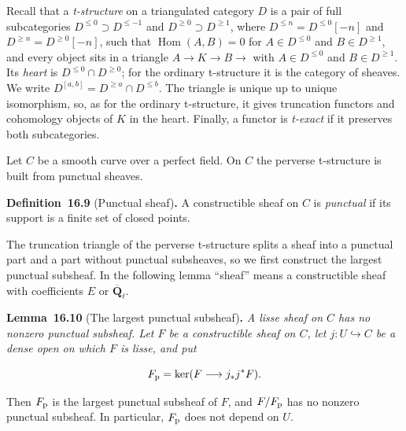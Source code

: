 \documentclass[11pt]{article}
\newenvironment{bpstatement}[2]{\par\addvspace{0.6\baselineskip}\noindent\textbf{#1}#2\textbf{.}\enspace\ignorespaces}
  {\par\addvspace{0.4\baselineskip}}
\newenvironment{bpstatementit}[2]{\begin{bpstatement}{#1}{#2}\itshape\ignorespaces}{\end{bpstatement}}
\providecommand{\Hom}{}\renewcommand{\Hom}{\operatorname{Hom}}
\begin{document}
Recall that a \emph{t-structure} on a triangulated category \(D\) is a pair of full subcategories \(D^{\le0}\supset D^{\le-1}\) and \(D^{\ge0}\supset D^{\ge1}\), where \(D^{\le n}=D^{\le0}[-n]\) and \(D^{\ge n}=D^{\ge0}[-n]\), such that \(\Hom(A,B)=0\) for \(A\in D^{\le0}\) and \(B\in D^{\ge1}\), and every object sits in a triangle \(A\to K\to
B\to\) with \(A\in D^{\le0}\) and \(B\in D^{\ge1}\). Its \emph{heart} is \(D^{\le0}\cap D^{\ge0}\); for the ordinary t-structure it is the category of sheaves. We write \(D^{[a,b]}=D^{\ge a}\cap D^{\le b}\). The triangle is unique up to unique isomorphism, so, as for the ordinary t-structure, it gives truncation functors and cohomology objects of \(K\) in the heart. Finally, a functor is \emph{t-exact} if it preserves both subcategories.

Let \(C\) be a smooth curve over a perfect field. On \(C\) the perverse t-structure is built from punctual sheaves.

\label{bp31}%
\begin{bpstatement}{Definition~16.9}{ (Punctual sheaf)}
A constructible sheaf on \(C\) is \emph{punctual} if its support is a finite set of closed points.
\end{bpstatement}

\label{bp32}%
The truncation triangle of the perverse t-structure splits a sheaf into a punctual part and a part without punctual subsheaves, so we first construct the largest punctual subsheaf. In the following lemma “sheaf” means a constructible sheaf with coefficients \(E\) or \(\overline{\mathbf Q}_\ell\).

\label{bp33}%
\begin{bpstatementit}{Lemma~16.10}{ (The largest punctual subsheaf)}
A lisse sheaf on \(C\) has no nonzero punctual subsheaf. Let \(F\) be a constructible sheaf on \(C\), let \(j:U\hookrightarrow C\) be a dense open on which \(F\) is lisse, and put

\[
F_{\rm p}=\ker(F\longrightarrow j_*j^*F).
\]

Then \(F_{\rm p}\) is the largest punctual subsheaf of \(F\), and \(F/F_{\rm p}\) has no nonzero punctual subsheaf. In particular, \(F_{\rm p}\) does not depend on \(U\).
\end{bpstatementit}
\end{document}
